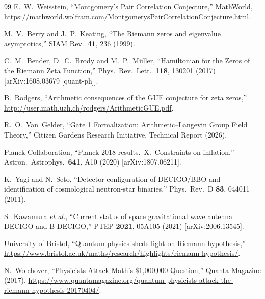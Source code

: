 \documentclass[12pt,a4paper]{article}
\begin{document}
\begin{thebibliography}{99}
E.~W.~Weisstein,
``Montgomery's Pair Correlation Conjecture,''
MathWorld,
\url{https://mathworld.wolfram.com/MontgomerysPairCorrelationConjecture.html}.

M.~V.~Berry and J.~P.~Keating,
``The Riemann zeros and eigenvalue asymptotics,''
SIAM Rev.\ \textbf{41}, 236 (1999).

C.~M.~Bender, D.~C.~Brody and M.~P.~M\"uller,
``Hamiltonian for the Zeros of the Riemann Zeta Function,''
Phys.\ Rev.\ Lett.\ \textbf{118}, 130201 (2017)
[arXiv:1608.03679 [quant-ph]].

B.~Rodgers,
``Arithmetic consequences of the GUE conjecture for zeta zeros,''
\url{http://user.math.uzh.ch/rodgers/ArithmeticGUE.pdf}.

R.~O.~Van~Gelder,
``Gate 1 Formalization: Arithmetic--Langevin Group Field Theory,''
Citizen Gardens Research Initiative, Technical Report (2026).

Planck Collaboration,
``Planck 2018 results.\ X.\ Constraints on inflation,''
Astron.\ Astrophys.\ \textbf{641}, A10 (2020)
[arXiv:1807.06211].

K.~Yagi and N.~Seto,
``Detector configuration of DECIGO/BBO and identification of cosmological neutron-star binaries,''
Phys.\ Rev.\ D \textbf{83}, 044011 (2011).

S.~Kawamura \emph{et al.},
``Current status of space gravitational wave antenna DECIGO and B-DECIGO,''
PTEP \textbf{2021}, 05A105 (2021)
[arXiv:2006.13545].

University of Bristol,
``Quantum physics sheds light on Riemann hypothesis,''
\url{https://www.bristol.ac.uk/maths/research/highlights/riemann-hypothesis/}.

N.~Wolchover,
``Physicists Attack Math's \$1,000,000 Question,''
Quanta Magazine (2017),
\url{https://www.quantamagazine.org/quantum-physicists-attack-the-riemann-hypothesis-20170404/}.

\end{thebibliography}
\end{document}
